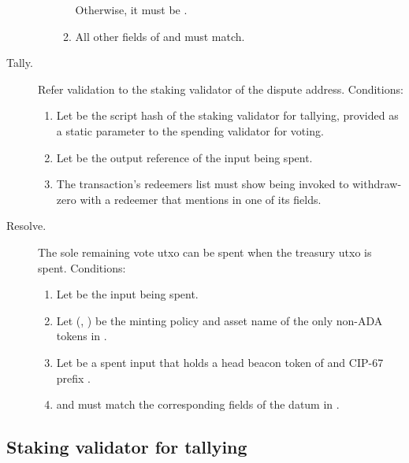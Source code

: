 \documentclass[../hydrozoa.tex]{subfiles}
\begin{document}
\begin{description}
\begin{itemize}
\begin{enumerate}[resume]
            Otherwise, it must be .
          \item All other fields of  and  must match.
        \end{enumerate}
    \end{itemize}
  \item[Tally.] Refer validation to the staking validator of the dispute address.
    Conditions:
    \begin{enumerate}
      \item Let  be the script hash of the staking validator for tallying, provided as a static parameter to the spending validator for voting.
      \item Let  be the output reference of the input being spent.
      \item The transaction's redeemers list must show  being invoked to withdraw-zero with a redeemer that mentions  in one of its fields.
    \end{enumerate}
  \item[Resolve.] The sole remaining vote utxo can be spent when the treasury utxo is spent.
    Conditions:
    \begin{enumerate}
      \item Let  be the input being spent.
      \item Let (, ) be the minting policy and asset name of the only non-ADA tokens in .
      \item Let  be a spent input that holds a head beacon token of  and CIP-67 prefix \headBeaconToken{}.
      \item {} and  must match the corresponding fields of the  datum in .
\end{enumerate}
\end{description}

\subsection{Staking validator for tallying}
\end{document}
